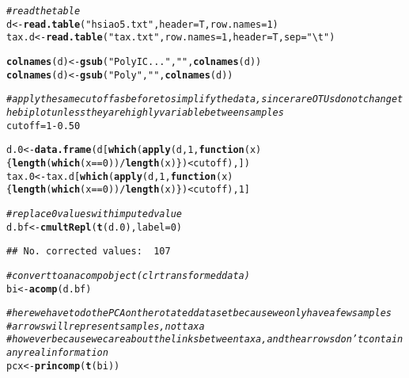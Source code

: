 \documentclass[11pt]{article}\usepackage[]{graphicx}\usepackage[]{color}
\makeatletter
\newcommand{\hlnum}[1]{\textcolor[rgb]{0.686,0.059,0.569}{#1}}%
\newcommand{\hlstr}[1]{\textcolor[rgb]{0.192,0.494,0.8}{#1}}%
\newcommand{\hlcom}[1]{\textcolor[rgb]{0.678,0.584,0.686}{\textit{#1}}}%
\newcommand{\hlopt}[1]{\textcolor[rgb]{0,0,0}{#1}}%
\newcommand{\hlstd}[1]{\textcolor[rgb]{0.345,0.345,0.345}{#1}}%
\newcommand{\hlkwa}[1]{\textcolor[rgb]{0.161,0.373,0.58}{\textbf{#1}}}%
\newcommand{\hlkwb}[1]{\textcolor[rgb]{0.69,0.353,0.396}{#1}}%
\newcommand{\hlkwc}[1]{\textcolor[rgb]{0.333,0.667,0.333}{#1}}%
\newcommand{\hlkwd}[1]{\textcolor[rgb]{0.737,0.353,0.396}{\textbf{#1}}}%
\newenvironment{kframe}{%
 \def\at@end@of@kframe{}%
 \ifinner\ifhmode%
  \def\at@end@of@kframe{\end{minipage}}%
  \begin{minipage}{\columnwidth}%
 \fi\fi%
 \def\FrameCommand##1{\hskip\@totalleftmargin \hskip-\fboxsep
 \colorbox{shadecolor}{##1}\hskip-\fboxsep
     \hskip-\linewidth \hskip-\@totalleftmargin \hskip\columnwidth}%
 \MakeFramed {\advance\hsize-\width
   \@totalleftmargin\z@ \linewidth\hsize
   \@setminipage}}%
 {\par\unskip\endMakeFramed%
 \at@end@of@kframe}
\newenvironment{knitrout}{}{} %
\makeatother
\begin{document}
\begin{knitrout}
\color{fgcolor}\begin{kframe}
\begin{alltt}
\hlcom{# read the table}
\hlstd{d} \hlkwb{<-} \hlkwd{read.table}\hlstd{(}\hlstr{"hsiao5.txt"}\hlstd{,} \hlkwc{header}\hlstd{=T,} \hlkwc{row.names}\hlstd{=}\hlnum{1}\hlstd{)}
\hlstd{tax.d} \hlkwb{<-} \hlkwd{read.table}\hlstd{(}\hlstr{"tax.txt"}\hlstd{,} \hlkwc{row.names}\hlstd{=}\hlnum{1}\hlstd{,} \hlkwc{header}\hlstd{=T,} \hlkwc{sep}\hlstd{=}\hlstr{"\textbackslash{}t"}\hlstd{)}

\hlkwd{colnames}\hlstd{(d)} \hlkwb{<-} \hlkwd{gsub}\hlstd{(}\hlstr{"PolyIC..."}\hlstd{,} \hlstr{""}\hlstd{,} \hlkwd{colnames}\hlstd{(d))}
\hlkwd{colnames}\hlstd{(d)} \hlkwb{<-} \hlkwd{gsub}\hlstd{(}\hlstr{"Poly"}\hlstd{,} \hlstr{""}\hlstd{,} \hlkwd{colnames}\hlstd{(d))}

\hlcom{# apply the same cutoff as before to simplify the data, since rare OTUs do not change the biplot unless they are highly variable between samples}
\hlstd{cutoff} \hlkwb{=} \hlnum{1}\hlopt{-}\hlnum{0.50}

\hlstd{d.0} \hlkwb{<-} \hlkwd{data.frame}\hlstd{(d[}\hlkwd{which}\hlstd{(}\hlkwd{apply}\hlstd{(d,} \hlnum{1}\hlstd{,} \hlkwa{function}\hlstd{(}\hlkwc{x}\hlstd{)\{}\hlkwd{length}\hlstd{(}\hlkwd{which}\hlstd{(x} \hlopt{==} \hlnum{0}\hlstd{))}\hlopt{/}\hlkwd{length}\hlstd{(x)\})} \hlopt{<} \hlstd{cutoff),])}
\hlstd{tax.0} \hlkwb{<-} \hlstd{tax.d[}\hlkwd{which}\hlstd{(}\hlkwd{apply}\hlstd{(d,} \hlnum{1}\hlstd{,} \hlkwa{function}\hlstd{(}\hlkwc{x}\hlstd{)\{}\hlkwd{length}\hlstd{(}\hlkwd{which}\hlstd{(x} \hlopt{==} \hlnum{0}\hlstd{))}\hlopt{/}\hlkwd{length}\hlstd{(x)\})} \hlopt{<} \hlstd{cutoff),}\hlnum{1}\hlstd{]}

\hlcom{# replace 0 values with imputed value}
\hlstd{d.bf} \hlkwb{<-}\hlkwd{cmultRepl}\hlstd{(}\hlkwd{t}\hlstd{(d.0),}  \hlkwc{label}\hlstd{=}\hlnum{0}\hlstd{)}
\end{alltt}
\begin{verbatim}
## No. corrected values:  107
\end{verbatim}
\begin{alltt}
\hlcom{# convert to an acomp object (clr transformed data)}
\hlstd{bi} \hlkwb{<-} \hlkwd{acomp}\hlstd{(d.bf)}

\hlcom{# here we have to do the PCA on the rotated dataset because we only have a few samples}
\hlcom{# arrows will represent samples, not taxa}
\hlcom{# however because we care about the links between taxa, and the arrows don't contain any real information}
\hlstd{pcx} \hlkwb{<-} \hlkwd{princomp}\hlstd{(}\hlkwd{t}\hlstd{(bi))}



\end{alltt}
\end{kframe}
\end{knitrout}
\end{document}
